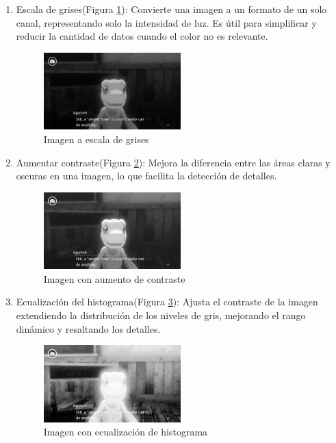 \begin{enumerate}
	\item Escala de grises(Figura \ref{fig:EscalaGrises}):
	Convierte una imagen a un formato de un solo canal, representando solo la intensidad de luz. Es útil para simplificar y reducir la cantidad de datos cuando el color no es relevante.
	\begin{figure}[H]
		\centering
		\includegraphics[width = 0.5\textwidth]{Imagenes/Preprocesado/1.png}
		\caption{Imagen a escala de grises}
		\label{fig:EscalaGrises}
	\end{figure}
	\item Aumentar contraste(Figura \ref{fig:Contraste}): 
	Mejora la diferencia entre las áreas claras y oscuras en una imagen, lo que facilita la detección de detalles.
		\begin{figure}[H]
		\centering
		\includegraphics[width = 0.5\textwidth]{Imagenes/Preprocesado/2.png}
		\caption{Imagen con aumento de contraste}
		\label{fig:Contraste}
	\end{figure}
	\item Ecualización del histograma(Figura \ref{fig:Histograma}):
	Ajusta el contraste de la imagen extendiendo la distribución de los niveles de gris, mejorando el rango dinámico y resaltando los detalles.
		\begin{figure}[H]
		\centering
		\includegraphics[width = 0.5\textwidth]{Imagenes/Preprocesado/3.png}
		\caption{Imagen con ecualización de histograma}
			\label{fig:Histograma}
	\end{figure}
	

\end{enumerate}
